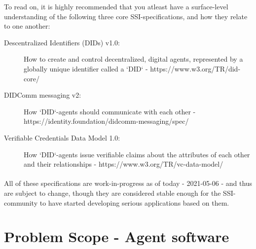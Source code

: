 To read on, it is highly recommended that you atleast have a surface-level understanding of the following three core SSI-specifications, and how they relate to one another:

\begin{description}
\item [Descentralized Identifiers (DIDs) v1.0:] How to create and control decentralized, digital agents, represented by a globally unique identifier called a `DID` - https://www.w3.org/TR/did-core/
\item [DIDComm messaging v2:] How `DID`-agents should communicate with each other - https://identity.foundation/didcomm-messaging/spec/ 
\item [Verifiable Credentials Data Model 1.0:] How `DID`-agents issue verifiable claims about the attributes of each other and their relationships - https://www.w3.org/TR/vc-data-model/ 
\end{description}


\paragraph{}
All of these specifications are work-in-progress as of today - 2021-05-06 - and thus are subject to change, though they are considered stable enough for the SSI-community to have started developing serious applications based on them.

\section{Problem Scope - Agent software}

